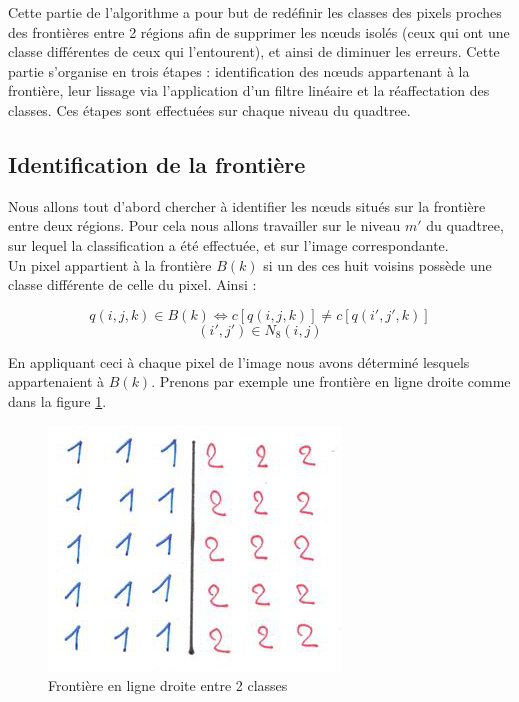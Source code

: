 Cette partie de l'algorithme a pour but de redéfinir les classes des pixels proches des frontières entre 2 régions afin de supprimer les nœuds isolés (ceux qui ont une classe différentes de ceux qui l'entourent), et ainsi de diminuer les erreurs. Cette partie s'organise en trois étapes : identification des nœuds appartenant à la frontière, leur lissage via l'application d'un filtre linéaire et la réaffectation des classes. Ces étapes sont effectuées sur chaque niveau du quadtree.

\subsection{Identification de la frontière}
	Nous allons tout d'abord chercher à identifier les nœuds situés sur la frontière entre deux régions. Pour cela nous allons travailler sur le niveau $m'$ du quadtree, sur lequel la classification a été effectuée, et sur l'image correspondante.\\

	Un pixel appartient à la frontière $B(k)$ si un des ces huit voisins possède une classe différente de celle du pixel. Ainsi :

	\[ q(i,j,k) \in B(k) \Leftrightarrow c[q(i,j,k)] \ne c[q(i',j',k)] \]
	\[ (i',j') \in N_8(i,j) \]

	En appliquant ceci à chaque pixel de l'image nous avons déterminé lesquels appartenaient à $B(k)$. Prenons par exemple une frontière en ligne droite comme dans la figure \ref{fig:bordure}.

	\begin{figure}[H]
		\centering
		\includegraphics[scale=0.75]{images/bordure.jpg}
		\caption{Frontière en ligne droite entre 2 classes}
		\label{fig:bordure}
	\end{figure}

